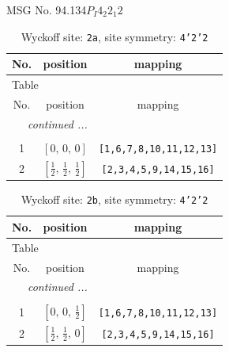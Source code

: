 \documentclass[fleqn,8pt]{jsarticle}
\begin{document}
\setcounter{MaxMatrixCols}{32}

\renewcommand{\tablename}{Table~}
\renewcommand{\figurename}{Figure~}
\begin{center}
\LARGE
MSG No. 94.134\quad$P_{I}4_{2}2_{1}2$
\end{center}
\renewcommand{\arraystretch}{1.2}
\begin{longtable}{ccc}
\caption{Wyckoff site: {\tt 2a}, site symmetry: {\tt 4'2'2}}
 \\
 \hline \hline
No. & position & mapping \\ \hline \endfirsthead

\multicolumn{2}{l}{\tablename\ \thetable{}} \\
 \hline \hline
No. & position & mapping \\ \hline \endhead

 \hline \hline
\multicolumn{2}{r}{\footnotesize\it continued ...} \\ \endfoot

 \hline \hline
\multicolumn{2}{r}{} \\ \endlastfoot

1 & $\left[ 0,\, 0,\, 0 \right]$ & {\tt [1,6,7,8,10,11,12,13]} \\ \hline
2 & $\left[ \frac{1}{2},\, \frac{1}{2},\, \frac{1}{2} \right]$ & {\tt [2,3,4,5,9,14,15,16]} \\
\end{longtable}
\renewcommand{\arraystretch}{1.2}
\begin{longtable}{ccc}
\caption{Wyckoff site: {\tt 2b}, site symmetry: {\tt 4'2'2}}
 \\
 \hline \hline
No. & position & mapping \\ \hline \endfirsthead

\multicolumn{2}{l}{\tablename\ \thetable{}} \\
 \hline \hline
No. & position & mapping \\ \hline \endhead

 \hline \hline
\multicolumn{2}{r}{\footnotesize\it continued ...} \\ \endfoot

 \hline \hline
\multicolumn{2}{r}{} \\ \endlastfoot

1 & $\left[ 0,\, 0,\, \frac{1}{2} \right]$ & {\tt [1,6,7,8,10,11,12,13]} \\ \hline
2 & $\left[ \frac{1}{2},\, \frac{1}{2},\, 0 \right]$ & {\tt [2,3,4,5,9,14,15,16]} \\
\end{longtable}
\end{document}
